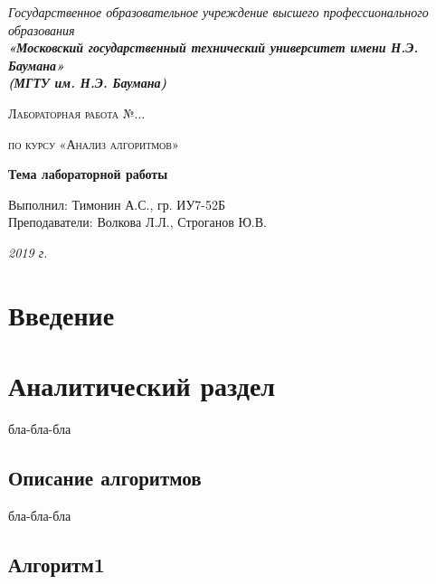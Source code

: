 \documentclass[12pt, a4paper]{report}
\begin{document}
    \begin{titlepage}

        \begin{center}
            \Large
            {\sl Государственное образовательное учреждение высшего профессионального образования\\
            {\bf«Московский государственный технический университет имени Н.Э. Баумана»\\
				(МГТУ им. Н.Э. Баумана)}}
            \vspace{3cm}

			{\scshape\LARGE Лабораторная работа №... \par}
			\vspace{0.5cm}	
			{\scshape\LARGE по курсу «Анализ алгоритмов» \par}
			\vspace{1.5cm}
			{\huge\bfseries Тема лабораторной работы \par}
			\vspace{2cm}
			\Large Выполнил: Тимонин А.С., гр. ИУ7-52Б\\
			\vspace{0.5cm}
			{\Large Преподаватели: Волкова Л.Л., Строганов Ю.В.}
		
			\vfill
			\Large \textit {2019 г.}
            
        \end{center}

    \end{titlepage}
	
	\tableofcontents

	\chapter*{Введение}
	

    \chapter{Аналитический раздел}
   	\vspace{-0.5cm}бла-бла-бла
	\section{Описание алгоритмов}
	бла-бла-бла

	\section{Алгоритм1}
	
\end{document}
